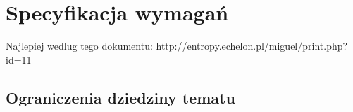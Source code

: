 \chapter{Specyfikacja wymagań}
Najlepiej wedlug tego dokumentu:
http://entropy.echelon.pl/miguel/print.php?id=11
\section{Ograniczenia dziedziny tematu}

